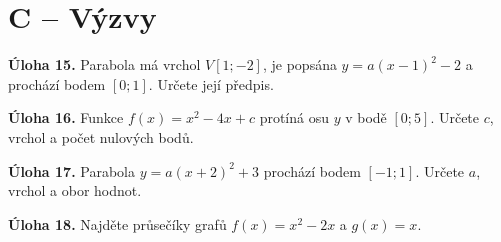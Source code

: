 \documentclass[11pt,a4paper]{article}
\begin{document}
\section*{C – Výzvy}
\noindent\textbf{Úloha 15.} Parabola má vrchol $V[1;-2]$, je popsána $y=a(x-1)^2-2$ a prochází bodem $[0;1]$. Určete její předpis.\par
\vspace{22mm}\par
\noindent\textbf{Úloha 16.} Funkce $f(x)=x^2-4x+c$ protíná osu $y$ v bodě $[0;5]$. Určete $c$, vrchol a počet nulových bodů.\par
\vspace{22mm}\par
\noindent\textbf{Úloha 17.} Parabola $y=a(x+2)^2+3$ prochází bodem $[-1;1]$. Určete $a$, vrchol a obor hodnot.\par
\vspace{22mm}\par
\noindent\textbf{Úloha 18.} Najděte průsečíky grafů $f(x)=x^2-2x$ a $g(x)=x$.\par
\vspace{22mm}\par
\end{document}
